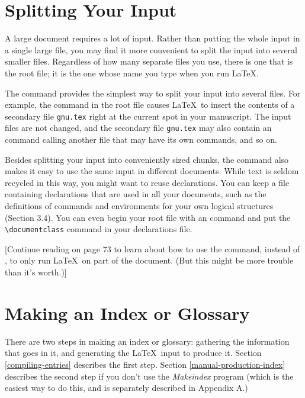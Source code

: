 \documentclass{article}
\begin{document}
\section{Splitting Your Input}

A large document requires a lot of input. Rather than putting the whole input in a single large
file, you may find it more convenient to split the input into several smaller files. Regardless of
how many separate files you use, there is one that is the root file; it is the one whose name you
type when you run \LaTeX.

The \verb:: command provides the simplest way to split your input into several files. For
example, the command \verb:: in the root file causes \LaTeX\ to insert the contents of a
secondary file {\tt gnu.tex} right at the current spot in your manuscript. The input files are not
changed, and the secondary file {\tt gnu.tex} may also contain an \verb:: command calling
another file that may have its own \verb:: commands, and so on.

Besides splitting your input into conveniently sized chunks, the \verb:: command also makes it
easy to use the same input in different documents. While text is seldom recycled in this way, you
might want to reuse declarations. You can keep a file containing declarations that are used in all
your documents, such as the definitions of commands and environments for your own logical
structures (Section 3.4). You can even begin your root file with an \verb:: command and put
the \verb:\documentclass: command in your declarations file.

[Continue reading on page 73 to learn about how to use the \verb:: command, instead
of \verb::, to only run \LaTeX\ on part of the document. (But this might be more trouble than
it's worth.)]

\section{Making an Index or Glossary}

There are two steps in making an index or glossary: gathering the information that goes in it, and
generating the \LaTeX\ input to produce it. 
Section \ref{compiling-entries} describes the first step. 
Section \ref{manual-production-index} describes the second step if you don't use the 
\emph{Makeindex} program (which is the easiest way to do this, and is separately described in 
Appendix A.)
\end{document}
